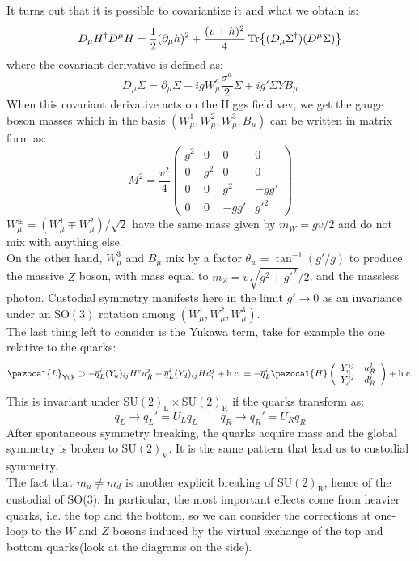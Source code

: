 \documentclass[../main.tex]{subfiles}
\begin{document}
It turns out that it is possible to covariantize it and what we obtain is:
\[
D_\mu H^\dagger D^\mu H=\frac{1}{2}(\partial_\mu h)^2+\frac{(v+h)^2}{4}\Tr{(D_\mu\Sigma^\dagger)(D^\mu\Sigma)}
\]
where the covariant derivative is defined as:
\[
D_\mu\Sigma=\partial_\mu\Sigma-igW_\mu^a\frac{\sigma^a}{2}\Sigma+ig'\Sigma YB_\mu
\]
When this covariant derivative acts on the Higgs field vev, we get the gauge boson masses which in the basis $(W_\mu^1,W_\mu^2,W_\mu^3,B_\mu)$ can be written in matrix form as:
\[
M^2=\frac{v^2}{4}\left(\begin{array}{cccc}
g^2 & 0 & 0 & 0 \\
0 & g^2 & 0 & 0 \\
0 & 0 & g^2 & -gg' \\
0 & 0 & -gg' & g'^2
\end{array}\right)
\]
$W_\mu^\pm=(W_\mu^1\mp W_\mu^2)/\sqrt{2}$ have the same mass given by $m_W=gv/2$ and do not mix with anything else.\\
On the other hand, $W_\mu^3$ and $B_\mu$ mix by a factor $\theta_w=\tan^{-1}(g'/g)$ to produce the massive $Z$ boson, with mass equal to $m_Z=v\sqrt{g^2+g'^2}/2$, and the massless photon. Custodial symmetry manifests here in the limit $g'\to0$ as an invariance under an SO$(3)$ rotation among $(W_\mu^1,W_\mu^2,W_\mu^3)$.\\
The last thing left to consider is the Yukawa term, take for example the one relative to the quarks:
\[
\pazocal{L}_{\text{Yuk}}\supset-\overline{q}_L^i(Y_u)_{ij}H^cu_R^j-\overline{q}_L^i(Y_d)_{ij}Hd_r^j+\text{h.c.}=-\overline{q}_L^i\pazocal{H}\left(\begin{array}{cc}
    Y_u^{ij} & u_R^j \\
    Y_d^{ij} & d_R^j
\end{array}\right)+\text{h.c.}
\]
This is invariant under SU$(2)_{\text{L}}\times$SU$(2)_{\text{R}}$ if the quarks transform as:
\[
q_L\to q_L'=U_Lq_L \qquad q_R\to q_R'=U_Rq_R
\]
After spontaneous symmetry breaking, the quarks acquire mass and the global symmetry is broken to SU$(2)_{\text{V}}$. It is the same pattern that lead us to custodial symmetry.\\
The fact that $m_u\neq m_d$ is another explicit breaking of SU$(2)_{\text{R}}$, hence of the custodial of SO(3). In particular, the most important effects come from heavier quarks, i.e. the top and the bottom, so we can consider the corrections at one-loop to the $W$ and $Z$ bosons induced by the virtual exchange of the top and bottom quarks(look at the diagrams on the side).\\
\end{document}
